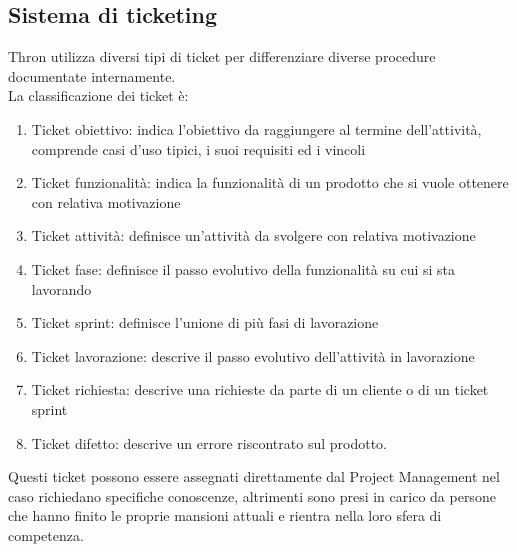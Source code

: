 \documentclass[a4paper, 12pt, twoside, openright]{book}
\begin{document}
\subsection{Sistema di ticketing}
Thron utilizza diversi tipi di ticket per differenziare diverse procedure documentate internamente.\\
La classificazione dei ticket è:
\begin{enumerate}
\item Ticket obiettivo: indica l'obiettivo da raggiungere al termine dell'attività, comprende casi d'uso tipici, i suoi requisiti ed i vincoli
\item Ticket funzionalità: indica la funzionalità di un prodotto che si vuole ottenere con relativa motivazione
\item Ticket attività: definisce un'attività da svolgere con relativa motivazione
\item Ticket fase: definisce il passo evolutivo della funzionalità su cui si sta lavorando
\item Ticket sprint: definisce l'unione di più fasi di lavorazione
\item Ticket lavorazione: descrive il passo evolutivo dell'attività in lavorazione
\item Ticket richiesta: descrive una richieste da parte di un cliente o di un ticket sprint
\item Ticket difetto: descrive un errore riscontrato sul prodotto.
\end{enumerate}
Questi ticket possono essere assegnati direttamente dal Project Management nel caso richiedano specifiche conoscenze, altrimenti sono presi in carico da persone che hanno finito le proprie mansioni attuali e rientra nella loro sfera di competenza.
\end{document}
